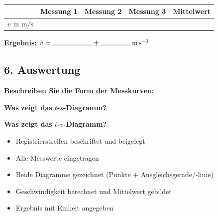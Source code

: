 \documentclass[11pt,a4paper]{scrartcl}
\begin{document}
	\begin{center}
		\renewcommand{\arraystretch}{2}
		\begin{tabular}{|c|c|c|c|c|}
			\hline
			& \textbf{Messung 1} & \textbf{Messung 2} & \textbf{Messung 3} & \textbf{Mittelwert} \\
			\hline
			$v$ in $\si{\metre\per\second}$ & & & & \\
			\hline
		\end{tabular}
	\end{center}
	
	\vspace{0.5cm}
	
	\begin{tcolorbox}[colback=yellow!10!white, colframe=yellow!50!black, width=\textwidth]
		\textbf{Ergebnis:} \hfill $\bar{v} = \rule{2cm}{0.4pt} \pm \rule{1.5cm}{0.4pt}\;\si{\metre\per\second}$
	\end{tcolorbox}
	
	\vspace{0.5cm}
	
	\subsection*{6. Auswertung}
	
	\textbf{Beschreiben Sie die Form der Messkurven:}
	
	\vspace{1.5cm}
	
	\textbf{Was zeigt das $t$-$s$-Diagramm?}
	
	\vspace{1.5cm}
	
	\textbf{Was zeigt das $t$-$v$-Diagramm?}
	
	\vspace{1.5cm}
	
	\begin{hilfebox}[title={\faIcon{lightbulb} Checkliste vor Abgabe}]
		\begin{itemize}
			\item[$\square$] Registrierstreifen beschriftet und beigelegt
			\item[$\square$] Alle Messwerte eingetragen
			\item[$\square$] Beide Diagramme gezeichnet (Punkte + Ausgleichsgerade/-linie)
			\item[$\square$] Geschwindigkeit berechnet und Mittelwert gebildet
			\item[$\square$] Ergebnis mit Einheit angegeben
		\end{itemize}
	\end{hilfebox}
	
\end{document}
